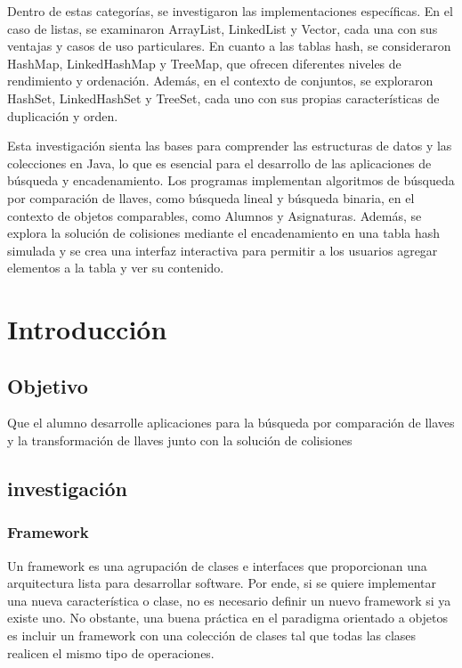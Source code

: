 \documentclass{report}
\begin{document}
Dentro de estas categorías, se investigaron las implementaciones específicas. En el caso de listas, se examinaron ArrayList, LinkedList y Vector, cada una con sus ventajas y casos de uso particulares. En cuanto a las tablas hash, se consideraron HashMap, LinkedHashMap y TreeMap, que ofrecen diferentes niveles de rendimiento y ordenación. Además, en el contexto de conjuntos, se exploraron HashSet, LinkedHashSet y TreeSet, cada uno con sus propias características de duplicación y orden.

Esta investigación sienta las bases para comprender las estructuras de datos y las colecciones en Java, lo que es esencial para el desarrollo de las aplicaciones de búsqueda y encadenamiento. Los programas implementan algoritmos de búsqueda por comparación de llaves, como búsqueda lineal y búsqueda binaria, en el contexto de objetos comparables, como Alumnos y Asignaturas. Además, se explora la solución de colisiones mediante el encadenamiento en una tabla hash simulada y se crea una interfaz interactiva para permitir a los usuarios agregar elementos a la tabla y ver su contenido.



\tableofcontents

  

\chapter{Introducción} 
    \section*{Objetivo}
    Que el alumno desarrolle aplicaciones para la búsqueda por comparación de llaves y la
    transformación de llaves junto con la solución de colisiones
    \section*{investigación}
      \subsection*{Framework}
      Un framework es una agrupación de clases e interfaces que proporcionan una arquitectura lista para desarrollar software. Por ende, si se quiere implementar una nueva característica o clase, no es necesario definir un nuevo framework si ya existe uno. No obstante, una buena práctica en el paradigma orientado a objetos es incluir un framework con una colección de clases tal que todas las clases realicen el mismo tipo de operaciones.
\end{document}
